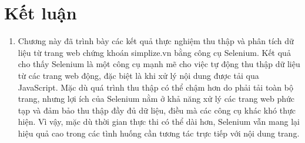 \section{Kết luận}
\begin{enumerate}
    \item []\hspace*{0.7cm}Chương này đã trình bày các kết quả thực nghiệm thu thập và phân tích dữ liệu từ trang web chứng khoán simplize.vn bằng công cụ Selenium. Kết quả cho thấy Selenium là một công cụ mạnh mẽ cho việc tự động thu thập dữ liệu từ các trang web động, đặc biệt là khi xử lý nội dung được tải qua JavaScript. Mặc dù quá trình thu thập có thể chậm hơn do phải tải toàn bộ trang, nhưng lợi ích của Selenium nằm ở khả năng xử lý các trang web phức tạp và đảm bảo thu thập đầy đủ dữ liệu, điều mà các công cụ khác khó thực hiện. Vì vậy, mặc dù thời gian thực thi có thể dài hơn, Selenium vẫn mang lại hiệu quả cao trong các tình huống cần tương tác trực tiếp với nội dung trang.
\end{enumerate}

